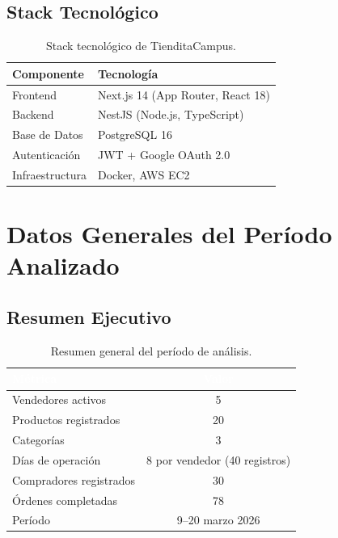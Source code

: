 \documentclass[12pt,letterpaper]{article}
\begin{document}
\subsection{Stack Tecnológico}
\begin{table}[H]
\centering
\begin{tabular}{ll}
\toprule
\textbf{Componente} & \textbf{Tecnología} \\
\midrule
Frontend   & Next.js 14 (App Router, React 18) \\
Backend    & NestJS (Node.js, TypeScript) \\
Base de Datos & PostgreSQL 16 \\
Autenticación & JWT + Google OAuth 2.0 \\
Infraestructura & Docker, AWS EC2 \\
\bottomrule
\end{tabular}
\caption{Stack tecnológico de TienditaCampus.}
\end{table}

\newpage
\section{Datos Generales del Período Analizado}

\subsection{Resumen Ejecutivo}
\begin{table}[H]
\centering
{}
\begin{tabular}{lc}
\toprule
\rowcolor{tabheader}\textcolor{white}{\textbf{Métrica}} & \textcolor{white}{\textbf{Valor}} \\
\midrule
Vendedores activos        & 5 \\
Productos registrados     & 20 \\
Categorías                & 3 \\
Días de operación         & 8 por vendedor (40 registros) \\
Compradores registrados   & 30 \\
Órdenes completadas       & 78 \\
Período                   & 9--20 marzo 2026 \\
\bottomrule
\end{tabular}
\caption{Resumen general del período de análisis.}
\end{table}
\end{document}
